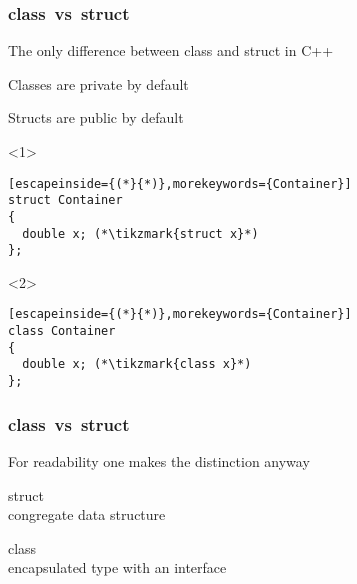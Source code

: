 \documentclass[14pt,a4paper,dvipsnames,usenames]{beamer}
\begin{document}
\begin{frame}[fragile]
  \frametitle{class \,vs\, struct}

  The only difference between {\color{FeebleWeek}class} and {\color{FeebleWeek}struct} in C++

  \vspace{.5em}
  \hspace{1cm}Classes are {\color{Marty}private} by default

  \vspace{.5em}
  \hspace{1cm}Structs are {\color{FeebleWeek}public} by default

  \vspace{1em}
  \begin{onlyenv}<1>
  \begin{lstlisting}[escapeinside={(*}{*)},morekeywords={Container}]
struct Container
{
  double x; (*\tikzmark{struct x}*)
};
  \end{lstlisting}

  \nointerlineskip
  \end{onlyenv}

  \begin{onlyenv}<2>
  \begin{lstlisting}[escapeinside={(*}{*)},morekeywords={Container}]
class Container
{
  double x; (*\tikzmark{class x}*)
};
  \end{lstlisting}

  \nointerlineskip
  \end{onlyenv}
  
\end{frame}

\begin{frame}[fragile]
  \frametitle{class \,vs\, struct}

  For readability one makes the distinction anyway

  \vspace{1em}
  {\large\color{FeebleWeek}struct}\\
  congregate data structure

  \vspace{1em}
  {\large\color{FeebleWeek}class}\\
  encapsulated type with an interface

\end{frame}
\end{document}
